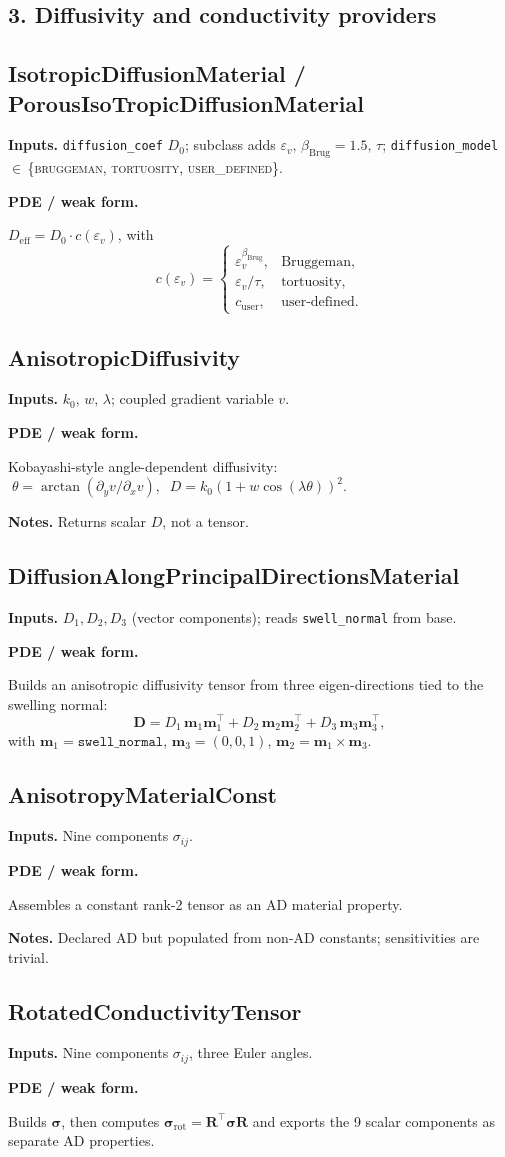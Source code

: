 \documentclass[11pt]{article}
\newcommand{\eps}{\varepsilon}
\newenvironment{ecmEntry}[1]{%
  \subsection{#1}%
}{}
\newcommand{\inputsRow}[1]{\par\noindent\textbf{Inputs.} #1\par}
\newcommand{\pdeRow}[1]{\par\noindent\textbf{PDE / weak form.}\par #1\par}
\newcommand{\notesRow}[1]{\par\noindent\textbf{Notes.} #1\par}
\begin{document}
\subsection*{3. Diffusivity and conductivity providers}

\begin{ecmEntry}{IsotropicDiffusionMaterial / PorousIsoTropicDiffusionMaterial}
\inputsRow{\texttt{diffusion\_coef} $D_0$; subclass adds $\eps_v,\,\beta_{\text{Brug}}=1.5,\,\tau$;
\texttt{diffusion\_model}\,$\in$\,\{\textsc{bruggeman}, \textsc{tortuosity}, \textsc{user\_defined}\}.}
\pdeRow{$D_{\text{eff}} = D_0\cdot c(\eps_v)$, with
\[
  c(\eps_v) = \begin{cases}
    \eps_v^{\beta_{\text{Brug}}}, & \text{Bruggeman},\\
    \eps_v/\tau, & \text{tortuosity},\\
    c_{\text{user}}, & \text{user-defined.}
  \end{cases}
\]}
\end{ecmEntry}

\begin{ecmEntry}{AnisotropicDiffusivity}
\inputsRow{$k_0,\,w,\,\lambda$; coupled gradient variable $v$.}
\pdeRow{Kobayashi-style angle-dependent diffusivity:
$\;\theta = \arctan(\partial_y v / \partial_x v),\;\;
D = k_0(1 + w\cos(\lambda\theta))^2$.}
\notesRow{Returns scalar $D$, not a tensor.}
\end{ecmEntry}

\begin{ecmEntry}{DiffusionAlongPrincipalDirectionsMaterial}
\inputsRow{$D_1,D_2,D_3$ (vector components); reads \texttt{swell\_normal} from base.}
\pdeRow{Builds an anisotropic diffusivity tensor from three eigen-directions tied to the
swelling normal:
\[
  \mathbf{D} = D_1\,\bm{m}_1\bm{m}_1^{\!\top} + D_2\,\bm{m}_2\bm{m}_2^{\!\top} + D_3\,\bm{m}_3\bm{m}_3^{\!\top},
\]
with $\bm{m}_1 = \texttt{swell\_normal}$, $\bm{m}_3 = (0,0,1)$, $\bm{m}_2 = \bm{m}_1\!\times\!\bm{m}_3$.}
\end{ecmEntry}

\begin{ecmEntry}{AnisotropyMaterialConst}
\inputsRow{Nine components $\sigma_{ij}$.}
\pdeRow{Assembles a constant rank-2 tensor as an AD material property.}
\notesRow{Declared AD but populated from non-AD constants; sensitivities are trivial.}
\end{ecmEntry}

\begin{ecmEntry}{RotatedConductivityTensor}
\inputsRow{Nine components $\sigma_{ij}$, three Euler angles.}
\pdeRow{Builds $\bm{\sigma}$, then computes $\bm{\sigma}_{\text{rot}} = \bm{R}^{\!\top}\bm{\sigma}\bm{R}$
and exports the 9 scalar components as separate AD properties.}
\end{ecmEntry}
\end{document}
